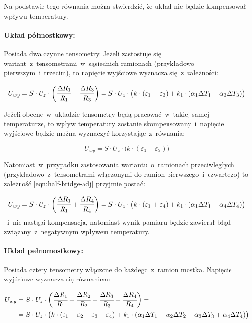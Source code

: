 Na podstawie tego równania można stwierdzić, że układ nie będzie kompensował wpływu temperatury.

\paragraph{Układ półmostkowy:} Posiada dwa czynne tensometry. Jeżeli zastostuje się
wariant~z~tensometrami~w~sąsiednich ramionach (przykładowo pierwszym~i~trzecim), to napięcie
wyjściowe wyznacza się~z~zależności:

\begin{equation}\label{eqn:half-bridge-adj}
  U_{wy}=S\cdot{U_z}\cdot\bigg(\cfrac{\Delta R_1}{R_1}-\cfrac{\Delta R_3}{R_3}\bigg)=
  S\cdot{U_z}\cdot\big({k}\cdot(\varepsilon_1-\varepsilon_3)+{k_1}\cdot(\alpha_1
  \Delta{T_1}-\alpha_3\Delta{T_3})\big)
\end{equation}

Jeżeli obecne~w~układzie tensometry będą pracować~w~takiej samej temperaturze, to wpływ temperatury
zostanie skompensowany~i~napięcie wyjściowe będzie można wyznaczyć korzystając~z~równania:

\begin{equation}\label{eqn:half-bridge-compensation}
  U_{wy}=S\cdot{U_z}\cdot\big({k}\cdot(\varepsilon_1-\varepsilon_3)\big)
\end{equation}

Natomiast~w~przypadku zastosowania wariantu~o~ramionach przeciwległych (przykładowo~z~tensometrami
włączonymi do ramion pierwszego~i~czwartego) to zależność \ref{eqn:half-bridge-adj} przyjmie postać:

\begin{equation}
  U_{wy}=S\cdot{U_z}\cdot\bigg(\cfrac{\Delta R_1}{R_1}+\cfrac{\Delta R_4}{R_4}\bigg)=
  S\cdot{U_z}\cdot\big({k}\cdot(\varepsilon_1+\varepsilon_4)+{k_1}\cdot(\alpha_1
  \Delta{T_1}+\alpha_4\Delta{T_4})\big)
\end{equation}
~i~nie nastąpi kompensacja, natomiast wynik pomiaru będzie zawierał błąd związany~z~negatywnym
wpływem temperatury.

\paragraph{Układ pełnomostkowy:} Posiada cztery tensometry włączone do każdego~z~ramion mostka.
Napięcie wyjściowe wyznacza się równaniem:

\begin{align}
  U_{wy} & =S\cdot{U_z}\cdot\bigg(\cfrac{\Delta R_1}{R_1}-\cfrac{\Delta R_2}{R_2}-
  \cfrac{\Delta R_3}{R_3}+\cfrac{\Delta R_4}{R_4}\bigg)=              \nonumber    \\
         & =S\cdot{U_z}\cdot\big({k}\cdot
  (\varepsilon_1-\varepsilon_2-\varepsilon_3+\varepsilon_4)+{k_1}\cdot(\alpha_1\Delta{T_1}-
  \alpha_2\Delta{T_2}-\alpha_3\Delta{T_3}+\alpha_4\Delta{T_4})\big)
\end{align}

